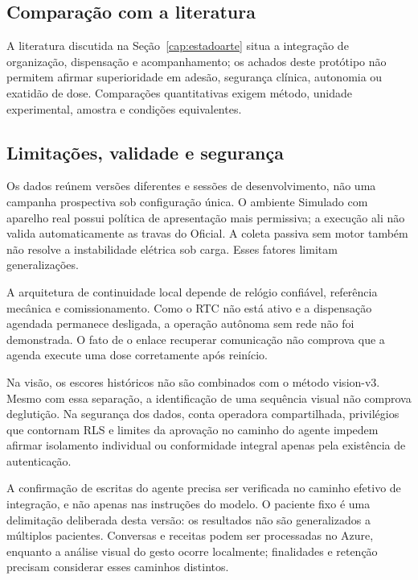 \subsection{Comparação com a literatura}
A literatura discutida na Seção~\ref{cap:estadoarte} situa a integração de organização, dispensação e acompanhamento; os achados deste protótipo não permitem afirmar superioridade em adesão, segurança clínica, autonomia ou exatidão de dose. Comparações quantitativas exigem método, unidade experimental, amostra e condições equivalentes.

\subsection{Limitações, validade e segurança}
Os dados reúnem versões diferentes e sessões de desenvolvimento, não uma campanha prospectiva sob configuração única. O ambiente Simulado com aparelho real possui política de apresentação mais permissiva; a execução ali não valida automaticamente as travas do Oficial. A coleta passiva sem motor também não resolve a instabilidade elétrica sob carga. Esses fatores limitam generalizações. 

A arquitetura de continuidade local depende de relógio confiável, referência mecânica e comissionamento. Como o RTC não está ativo e a dispensação agendada permanece desligada, a operação autônoma sem rede não foi demonstrada. O fato de o enlace recuperar comunicação não comprova que a agenda execute uma dose corretamente após reinício. 

Na visão, os escores históricos não são combinados com o método vision-v3. Mesmo com essa separação, a identificação de uma sequência visual não comprova deglutição. Na segurança dos dados, conta operadora compartilhada, privilégios que contornam RLS e limites da aprovação no caminho do agente impedem afirmar isolamento individual ou conformidade integral apenas pela existência de autenticação. 

A confirmação de escritas do agente precisa ser verificada no caminho efetivo de integração, e não apenas nas instruções do modelo. O paciente fixo é uma delimitação deliberada desta versão: os resultados não são generalizados a múltiplos pacientes. Conversas e receitas podem ser processadas no Azure, enquanto a análise visual do gesto ocorre localmente; finalidades e retenção precisam considerar esses caminhos distintos.

